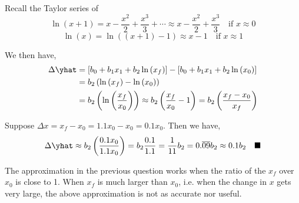 \documentclass[12pt]{article}
\begin{document}
\begin{enumerate}
\newpage

\begin{tcolorbox}[colback=white, sharp corners]

Recall the Taylor series of
\[
	\ln(x+1) = x - \dfrac{x^2}{2} + \dfrac{x^3}{3} + \cdots \approx x - \dfrac{x^2}{2} + \dfrac{x^3}{3} \quad \text{if } x \approx 0 
\]	
\[
	\ln(x) = \ln\left((x+1) -1 \right) \approx x -1 \quad \text{if } x \approx 1
\]

We then have,
\begin{align*}
\Delta \yhat &= \left[b_0 + b_1x_1 + b_2 \ln\left( x_f \right) \right] - \left[ b_0 + b_1x_1 + b_2 \ln\left( x_0 \right) \right] \\
&= b_2\left( \ln\left( x_f \right) - \ln\left( x_0 \right) \right) \\
&= b_2 \left( \ln\left( \dfrac{x_f}{x_0} \right) \right) \approx b_2 \left( \dfrac{x_f}{x_0} -1 \right) = b_2 \left( \dfrac{x_f - x_0}{x_f} \right)
\end{align*}

Suppose $\Delta x = x_f - x_0 = 1.1x_0 - x_0 = 0.1 x_0$. Then we have, 
\[
	\Delta \yhat \approx b_2 \left( \dfrac{0.1x_0}{1.1x_0} \right) = b_2\dfrac{0.1}{1.1} = \dfrac{1}{11}b_2 = 0.\overline{09}b_2 \approx 0.1b_2 \quad \blacksquare
\]

\end{tcolorbox}


\begin{tcolorbox}[colback=white, sharp corners]
The approximation in the previous question works when the ratio of the $x_f$ over $x_0$ is close to 1. When $x_f$ is much larger than $x_0$, i.e. when the change in $x$ gets very large, the above approximation is not as accurate nor useful. 
\end{tcolorbox}


\end{enumerate}
\end{document}
